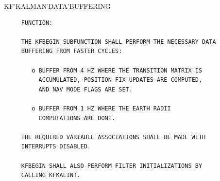 \begin{frame}
KF'KALMAN'DATA'BUFFERING
\begin{verbatim}
     FUNCTION:

     THE KFBEGIN SUBFUNCTION SHALL PERFORM THE NECESSARY DATA
     BUFFERING FROM FASTER CYCLES:

        o BUFFER FROM 4 HZ WHERE THE TRANSITION MATRIX IS
          ACCUMULATED, POSITION FIX UPDATES ARE COMPUTED,
          AND NAV MODE FLAGS ARE SET.

        o BUFFER FROM 1 HZ WHERE THE EARTH RADII
          COMPUTATIONS ARE DONE.

     THE REQUIRED VARIABLE ASSOCIATIONS SHALL BE MADE WITH
     INTERRUPTS DISABLED.

     KFBEGIN SHALL ALSO PERFORM FILTER INITIALIZATIONS BY
     CALLING KFKALINT.


\end{verbatim}
\end{frame}
